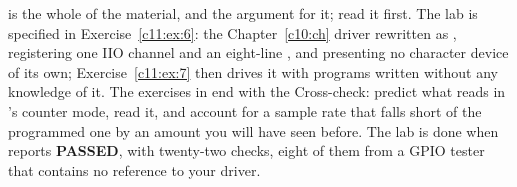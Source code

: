  is the whole of the material, and the argument for it; read it first. The lab is
specified in Exercise~\ref{c11:ex:6}: the Chapter~\ref{c10:ch} driver rewritten as
, registering one IIO channel and an eight-line , and
presenting no character device of its own; Exercise~\ref{c11:ex:7} then drives it with programs
written without any knowledge of it. The exercises in  end with the
Cross-check: predict what  reads in 's counter mode, read it,
and account for a sample rate that falls short of the programmed one by an amount you will have
seen before. The lab is done when  reports \textbf{PASSED}, with twenty-two
checks, eight of them from a GPIO tester that contains no reference to your driver.




